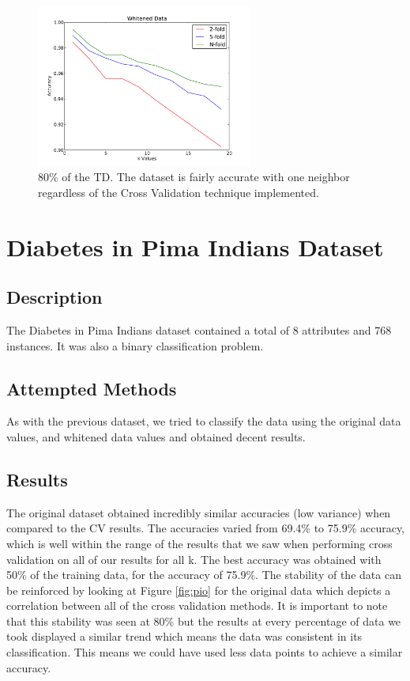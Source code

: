 \documentclass[conference]{acmsiggraph}
\begin{document}
\begin{figure}[h]
  \centering
  \includegraphics[width=2.8in]{images/dba_w_20.pdf}
  \caption{80\% of the TD. The dataset is fairly accurate with one neighbor regardless of the Cross Validation technique implemented.}
  \label{fig:dbaw}
\end{figure}

\section{Diabetes in Pima Indians Dataset}
\subsection{Description}
The Diabetes in Pima Indians dataset contained a total of 8 attributes and 768 instances. It was also a binary classification problem.
\subsection {Attempted Methods}
As with the previous dataset, we tried to classify the data using the original data values, and whitened data values and obtained decent results. 
\subsection {Results}
The original dataset obtained incredibly similar accuracies (low variance) when compared to the CV results. The accuracies varied from 69.4\% to 75.9\% accuracy, which is well within the range of the results that we saw when performing cross validation on all of our results for all k. The best accuracy was obtained with 50\% of the training data, for the accuracy of 75.9\%. The stability of the data can be reinforced by looking at Figure \ref{fig:pio} for the original data which depicts a correlation between all of the cross validation methods. It is important to note that this stability was seen at 80\% but the results at every percentage of data we took displayed a similar trend which means the data was consistent in its classification. This means we could have used less data points to achieve a similar accuracy.
\end{document}
